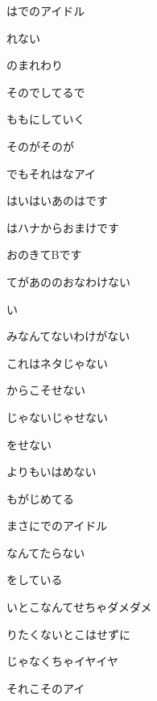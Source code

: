 はでのアイドル

れない

のまれわり

そのでしてるで

ももにしていく

そのがそのが

でもそれはなアイ

\bigskip

はいはいあのはです

はハナからおまけです

おのきてBです

てがあののおなわけない

い

みなんてないわけがない

これはネタじゃない

からこそせない

じゃないじゃせない

をせない

よりもいはめない

\bigskip

もがじめてる

まさにでのアイドル

なんてたらない

をしている

いとこなんてせちゃダメダメ

りたくないとこはせずに

じゃなくちゃイヤイヤ

それこそのアイ

\bigskip

